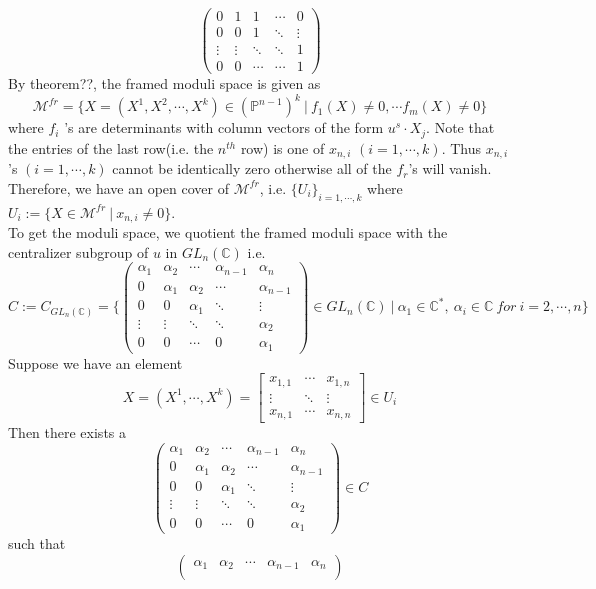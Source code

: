 \begin{example}
\[\begin{pmatrix}
		0&1&1&\cdots&0\\
		0&0&1&\ddots&\vdots\\		
		\vdots&\vdots&\ddots&\ddots&1\\
		0&0&\cdots&\cdots&1
	\end{pmatrix}
\]
By theorem??, the framed moduli space is given as
\[
	\mathcal{M}^{fr}=\{X=(X^1,X^2,\cdots,X^k)\in (\mathbb{P}^{n-1})^k~|~	f_1(X)\neq0,\cdots f_m(X)\neq 0\}
\]
where $f_i$ 's are determinants with column vectors of the form $u^s \cdot X_j$. Note that the entries of the last row(i.e. the $n^{th}$ row) is one of $x_{n,i}$ $(i=1,\cdots, k)$. Thus $x_{n,i}$ 's $(i=1,\cdots,k)$ cannot be identically zero otherwise all of the $f_r$'s will vanish. Therefore, we have an open cover of $\mathcal{M}^{fr}$, i.e.  $\{ U_i \}_{i=1,\cdots,k}$ where $U_i:=\{X\in \mathcal{M}^{fr} ~|~ x_{n,i}\neq0\}$. \\
To get the moduli space, we quotient the framed moduli space with the centralizer subgroup of $u$ in $GL_{n}(\mathbb{C})$ i.e.
\[
	C:=	
	C_{GL_n(\mathbb{C})}
	=\{	
	\begin{pmatrix}
		\alpha_1&\alpha_2&\cdots&\alpha_{n-1}&\alpha_n\\
		0&\alpha_1&\alpha_2&\cdots&\alpha_{n-1}\\
		0&0&\alpha_1&\ddots&\vdots\\		
		\vdots&\vdots&\ddots&\ddots&\alpha_2\\
		0&0&\cdots&0&\alpha_1
	\end{pmatrix}
	\in GL_n(\mathbb{C})~|~\alpha_1\in \mathbb{C^*},~\alpha_i\in \mathbb{C}~for~i=2,\cdots,n  \}
\]
Suppose we have an element 
\[
	X=(X^1,\cdots,X^k)=
	\begin{bmatrix}
		x_{1,1}&\cdots&x_{1,n}\\
		\vdots&\ddots&\vdots\\
		x_{n,1}&\cdots&x_{n,n}
	\end{bmatrix}
	\in U_i
\]
Then there exists a 
\[
	\begin{pmatrix}
		\alpha_1&\alpha_2&\cdots&\alpha_{n-1}&\alpha_n\\
		0&\alpha_1&\alpha_2&\cdots&\alpha_{n-1}\\
		0&0&\alpha_1&\ddots&\vdots\\		
		\vdots&\vdots&\ddots&\ddots&\alpha_2\\
		0&0&\cdots&0&\alpha_1
	\end{pmatrix}
	\in
	C
\]
such that
\[
	\begin{pmatrix}
		\alpha_1&\alpha_2&\cdots&\alpha_{n-1}&\alpha_n\\

\end{pmatrix}\]
\end{example}
